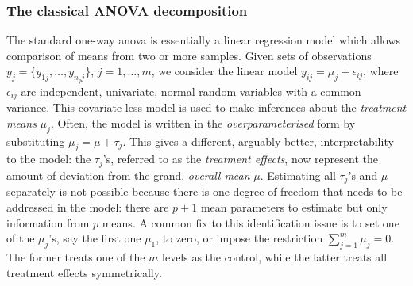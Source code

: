 \subsubsection{The classical ANOVA decomposition}

The standard one-way \gls*{anova} is essentially a linear regression model which allows comparison of means from two or more samples.
Given sets of observations $y_j = \{y_{1j},\dots,y_{n_jj}\}$, $j=1,\dots,m$, we consider the linear model $y_{ij} = \mu_j + \epsilon_{ij}$, where $\epsilon_{ij}$ are independent, univariate, normal random variables with a common variance.
This covariate-less model is used to make inferences about the  \emph{treatment means} $\mu_j$.
Often, the model is written in the \emph{overparameterised} form by substituting $\mu_j = \mu + \tau_j$.
This gives a different, arguably better, interpretability to the model: the $\tau_j$'s, referred to as the \emph{treatment effects}, now represent the amount of deviation from the grand, \emph{overall mean} $\mu$.
Estimating all $\tau_j$'s and $\mu$ separately is not possible because there is one degree of freedom that needs to be addressed in the model: there are $p+1$ mean parameters to estimate but only information from $p$ means.
A common fix to this identification issue is to set one of the $\mu_j$'s, say the first one $\mu_1$, to zero, or impose the restriction $\sum_{j=1}^m \mu_j = 0$.
The former treats one of the $m$ levels as the control, while the latter treats all treatment effects symmetrically.


